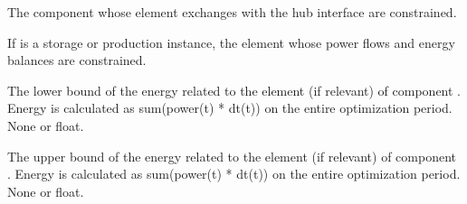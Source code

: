 \documentclass[letterpaper,10pt,english]{sphinxmanual}
\begin{document}
\begin{fulllineitems}
\begin{fulllineitems}
\label{\detokenize{generated/tamos.InterfaceMask:tamos.InterfaceMask.component}}
\pysigstartsignatures
{}
\pysigstopsignatures
\sphinxAtStartPar
The component whose element exchanges with the hub interface are constrained.

\end{fulllineitems}


\begin{fulllineitems}
\label{\detokenize{generated/tamos.InterfaceMask:tamos.InterfaceMask.element}}
\pysigstartsignatures
{}
\pysigstopsignatures
\sphinxAtStartPar
If  is a storage or production instance, the element whose power flows and energy balances are constrained.

\end{fulllineitems}


\begin{fulllineitems}
\label{\detokenize{generated/tamos.InterfaceMask:tamos.InterfaceMask.energy_lb}}
\pysigstartsignatures
{}
\pysigstopsignatures
\sphinxAtStartPar
The lower bound of the energy related to the element  (if relevant) of component .
Energy is calculated as sum(power(t) * dt(t)) on the entire optimization period.
None or float.

\end{fulllineitems}


\begin{fulllineitems}
\label{\detokenize{generated/tamos.InterfaceMask:tamos.InterfaceMask.energy_ub}}
\pysigstartsignatures
{}
\pysigstopsignatures
\sphinxAtStartPar
The upper bound of the energy related to the element  (if relevant) of component .
Energy is calculated as sum(power(t) * dt(t)) on the entire optimization period.
None or float.


\end{fulllineitems}
\end{fulllineitems}
\end{document}
